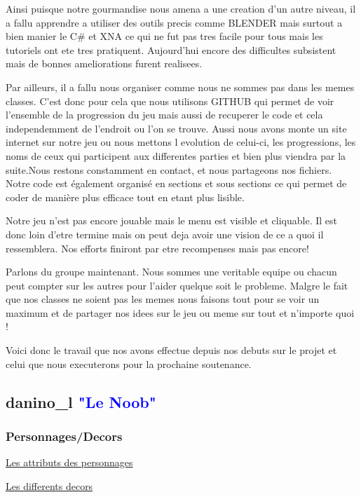 \documentclass{article}
\begin{document}
\par
Ainsi puisque notre gourmandise nous amena a une creation d'un autre niveau, il a fallu apprendre a utiliser des outils precis comme BLENDER mais surtout a bien manier le C\# et XNA ce qui ne fut pas tres facile pour tous mais les tutoriels ont ete tres pratiquent. Aujourd'hui encore des difficultes subsistent mais de bonnes ameliorations furent realisees.
\newline

\par
Par ailleurs, il a fallu nous organiser comme nous ne sommes pas dans les memes classes. C'est donc pour cela que nous utilisons GITHUB qui permet de voir l'ensemble de la progression du jeu mais aussi de recuperer le code et cela independemment de l'endroit ou l'on se trouve. Aussi nous avons monte un site internet sur notre jeu ou nous mettons l evolution de celui-ci, les progressions, les noms de ceux qui participent aux differentes parties et bien plus viendra par la suite.Nous restons constamment en contact, et nous partageons nos fichiers. Notre code est également organisé en sections et sous sections ce qui permet de coder de manière plus efficace tout en etant  plus lisible.
\newline

\par
Notre jeu n'est pas encore jouable mais le menu est visible et cliquable. Il est donc loin d'etre termine mais on peut deja avoir une vision de ce a quoi il ressemblera. Nos efforts finiront par etre recompenses mais pas encore!
\newline

\par
Parlons du groupe maintenant. Nous sommes une veritable equipe ou chacun peut compter sur les autres pour l'aider quelque soit le probleme. Malgre le fait que nos classes ne soient pas les memes nous faisons tout pour se voir un maximum et de partager nos idees sur le jeu ou meme sur tout et n'importe quoi !
\newline

\par
Voici donc le travail que nos avons effectue depuis nos debuts sur le projet et celui que nous executerons pour la prochaine soutenance.

\newpage

\subsection{danino\_l \textcolor{blue}{"Le Noob"}}
\subsubsection{Personnages/Decors}

\par
\underline{Les attributs des personnages}
\newline

\par

\underline{Les differents decors}
\newline
\end{document}
